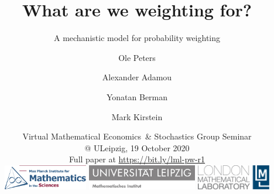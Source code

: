 \title[\insertlogo\\
\vspace{.5em}
\lmlblue{Mark Kirstein}]{\textbf{
What are we weighting for?
}}
\subtitle{A mechanistic model for probability weighting}


\author[M Kirstein]{
Ole Peters \and Alexander Adamou \and Yonatan Berman \and Mark Kirstein\\
\vspace{.5em}
}

\date[19 Oct 2020]{
Virtual Mathematical Economics~\& Stochastics Group Seminar\\
@ ULeipzig, 19 October 2020\\
\vspace{0.4cm} Full paper at \url{https://bit.ly/lml-pw-r1} \\
\vspace{.5cm}
\href{https://www.mis.mpg.de/jjost/research/economics.html}{\includegraphics[height=1.1cm]{img/MPIMIS_en.png}}
\hfill
\href{https://www.math.uni-leipzig.de/cms/de/forschung/abteilungen/wima/}{\includegraphics[height=1.1cm]{img/Uni_Leipzig_MathemInstitut.jpg}}
\hfill
\href{http://lml.org.uk}{
\includegraphics[height=1.1cm]{img/LML_LOGO_whiteBG.jpg}}
}
